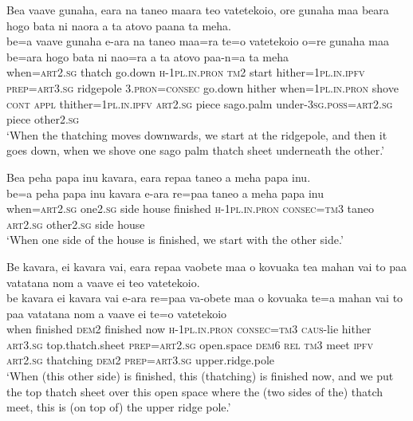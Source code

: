 \ea\label{ex:text12-42}
Bea vaave gunaha, eara na taneo maara teo vatetekoio, ore gunaha maa beara hogo bata ni naora a ta atovo paana ta meha.\\
\gll be=a	vaave	gunaha	e-ara	na	taneo	maa=ra	te=o	vatetekoio	o=re	gunaha	maa	be=ara	hogo	bata	ni	nao=ra	a	ta	atovo	paa-n=a	ta	meha\\
     when=\textsc{art}2.\textsc{sg}	thatch	go.down	\textsc{h}-1\textsc{pl}.\textsc{in}.\textsc{pron}	\textsc{tm}2	start	hither=1\textsc{pl}.\textsc{in}.\textsc{ipfv}	\textsc{prep}=\textsc{art}3.\textsc{sg}	ridgepole	3.\textsc{pron}=\textsc{consec}	go.down	hither	when=1\textsc{pl}.\textsc{in}.\textsc{pron}	shove	\textsc{cont}	\textsc{appl}	thither=1\textsc{pl}.\textsc{in}.\textsc{ipfv}	\textsc{art}2.\textsc{sg}	piece	sago.palm	under-3\textsc{sg}.\textsc{poss}=\textsc{art}2.\textsc{sg}	piece	other2.\textsc{sg}\\
\glt `When the thatching moves downwards, we start at the ridgepole, and then it goes down,  when we shove one sago palm thatch sheet underneath the other.'
\z

\newpage
\ea\label{ex:text12-43}
Bea peha papa inu kavara, eara repaa taneo a meha papa inu.\\
\gll be=a	peha	papa	inu	kavara	e-ara	re=paa	taneo	a	meha	papa	inu\\
     when=\textsc{art}2.\textsc{sg}	one2.\textsc{sg}	side	house	finished	\textsc{h}-1\textsc{pl}.\textsc{in}.\textsc{pron}	\textsc{consec}=\textsc{tm}3	taneo	\textsc{art}2.\textsc{sg}	other2.\textsc{sg}	side	house\\
\glt `When one side of the house is finished, we start with the other side.'
\z

\ea\label{ex:text12-44}
Be kavara, ei kavara vai, eara repaa vaobete maa o kovuaka tea mahan vai to paa vatatana nom a vaave ei teo vatetekoio.\\
\gll be	kavara	ei	kavara	vai	e-ara	re=paa	va-obete	maa	o	kovuaka	te=a	mahan	vai	to	paa	vatatana	nom	a	vaave	ei	te=o	vatetekoio\\
     when	finished	\textsc{dem}2	finished	now	\textsc{h}-1\textsc{pl}.\textsc{in}.\textsc{pron}	\textsc{consec}=\textsc{tm}3	\textsc{caus}-lie	hither	\textsc{art}3.\textsc{sg}	top.thatch.sheet	\textsc{prep}=\textsc{art}2.\textsc{sg}	open.space	\textsc{dem}6	\textsc{rel}	\textsc{tm}3	meet	\textsc{ipfv}	\textsc{art}2.\textsc{sg}	thatching	\textsc{dem}2	\textsc{prep}=\textsc{art}3.\textsc{sg}	upper.ridge.pole\\
\glt `When (this other side) is finished, this (thatching) is finished now, and we put the top thatch sheet over this open space where the (two sides of the) thatch meet, this is (on top of) the upper ridge pole.'
\z
